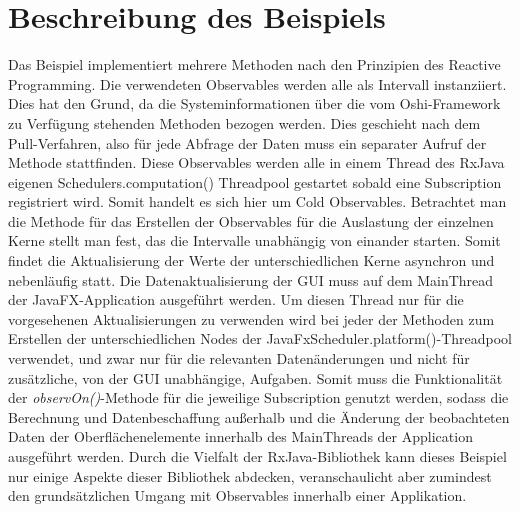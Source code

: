 \section{Beschreibung des Beispiels}
Das Beispiel implementiert mehrere Methoden nach den Prinzipien des Reactive Programming. Die verwendeten Observables werden alle als Intervall instanziiert. Dies hat den Grund, da die Systeminformationen über die vom Oshi-Framework zu Verfügung stehenden Methoden bezogen werden. Dies geschieht nach dem Pull-Verfahren, also für jede Abfrage der Daten muss ein separater Aufruf der Methode stattfinden. Diese Observables werden alle in einem Thread des RxJava eigenen Schedulers.computation() Threadpool gestartet sobald eine Subscription registriert wird. Somit handelt es sich hier um Cold Observables. Betrachtet man die Methode für das Erstellen der Observables für die Auslastung der einzelnen Kerne stellt man fest, das die Intervalle unabhängig von einander starten. Somit findet die Aktualisierung der Werte der unterschiedlichen Kerne asynchron und nebenläufig statt. Die Datenaktualisierung der GUI muss auf dem MainThread der JavaFX-Application ausgeführt werden. Um diesen Thread nur für die vorgesehenen Aktualisierungen zu verwenden wird bei jeder der Methoden zum Erstellen der unterschiedlichen Nodes der JavaFxScheduler.platform()-Threadpool verwendet, und zwar nur für die relevanten Datenänderungen und nicht für zusätzliche, von der GUI unabhängige, Aufgaben. Somit muss die Funktionalität der \textit{observOn()}-Methode für die jeweilige Subscription genutzt werden, sodass die Berechnung und Datenbeschaffung außerhalb und die Änderung der beobachteten Daten der Oberflächenelemente innerhalb des MainThreads der Application ausgeführt werden. Durch die Vielfalt der RxJava-Bibliothek kann dieses Beispiel nur einige Aspekte dieser Bibliothek abdecken, veranschaulicht aber zumindest den grundsätzlichen Umgang mit Observables innerhalb einer Applikation.

